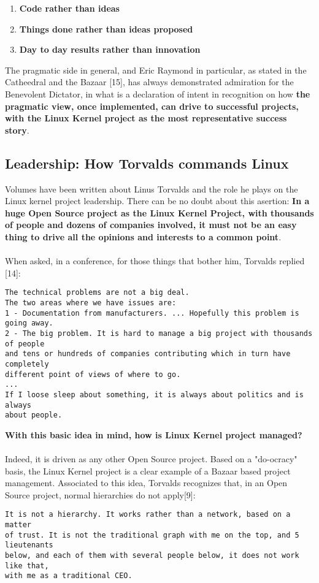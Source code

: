 \documentclass[11pt]{article}
\begin{document}
\begin{enumerate}\itemsep0pt
\item{\textbf{Code rather than ideas}}
\item{\textbf{Things done rather than ideas proposed}}
\item{\textbf{Day to day results rather than innovation}}
\end{enumerate}
The pragmatic side in general, and Eric Raymond in particular, as stated in the Catheedral and the Bazaar [15], has always demonstrated admiration for the Benevolent Dictator, in what is a declaration of intent in recognition on how \textbf{the pragmatic view, once implemented, can drive to successful projects, with the Linux Kernel project as the most representative success story}.
\subsection{Leadership: How Torvalds commands Linux}
Volumes have been written about Linus Torvalds and the role he plays on the Linux kernel project leadership. There can be no doubt about this asertion: \textbf{In a huge Open Source project as the Linux Kernel Project, with thousands of people and dozens of companies involved, it must not be an easy thing to drive all the opinions and interests to a common point}.\\
\\
When asked, in a conference, for those things that bother him, Torvalds replied [14]:
\begin{verbatim}
The technical problems are not a big deal.
The two areas where we have issues are:
1 - Documentation from manufacturers. ... Hopefully this problem is going away.
2 - The big problem. It is hard to manage a big project with thousands of people 
and tens or hundreds of companies contributing which in turn have completely 
different point of views of where to go.
...
If I loose sleep about something, it is always about politics and is always 
about people.
\end{verbatim}
\textbf{With this basic idea in mind, how is Linux Kernel project managed?}\\
\\
Indeed, it is driven as any other Open Source project. Based on a "do-ocracy" basis, the Linux Kernel project is a clear example of a Bazaar based project management. Associated to this idea, Torvalds recognizes that, in an Open Source project, normal hierarchies do not apply[9]:
\begin{verbatim}
It is not a hierarchy. It works rather than a network, based on a matter 
of trust. It is not the traditional graph with me on the top, and 5 lieutenants
below, and each of them with several people below, it does not work like that,
with me as a traditional CEO.
\end{verbatim}
\end{document}
